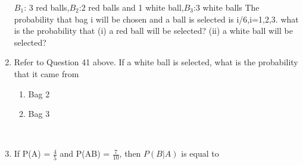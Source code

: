 \begin{enumerate}
$B_1$: 3 red balls,$B_2$:2 red balls and 1 white ball,$B_3$:3 white balls
The probability that bag i will be chosen and a ball is selected is i/6,i=1,2,3.
what is the probability that
(i) a red ball will be selected?     
(ii) a white ball will be selected?\\

\item Refer to Question 41 above. If a white ball is selected, what is the probability that it came from\\
\begin{enumerate}
\item  Bag 2
\item  Bag 3
\end{enumerate}\\
\solution

\item If P(A) = $\frac{4}{5}$ and P(AB) = $\frac{7}{10}$, then $P(B|A)$ is equal to\\
\solution

\end{enumerate}
